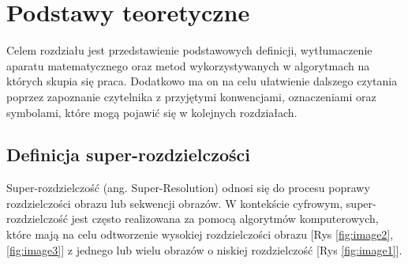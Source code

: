 \chapter{Podstawy teoretyczne}

Celem rozdziału jest przedstawienie podstawowych definicji, wytłumaczenie aparatu matematycznego oraz metod wykorzystywanych w algorytmach na których skupia się praca. Dodatkowo ma on na celu ułatwienie dalszego czytania poprzez zapoznanie czytelnika z przyjętymi konwencjami, oznaczeniami oraz symbolami, które mogą pojawić się w kolejnych rozdziałach. 


\section{Definicja super-rozdzielczości}

Super-rozdzielczość (ang. Super-Resolution) odnosi się do procesu poprawy rozdzielczości obrazu lub sekwencji obrazów. W kontekście cyfrowym, super-rozdzielczość jest często realizowana za pomocą algorytmów komputerowych, które mają na celu odtworzenie wysokiej rozdzielczości obrazu [Rys \ref{fig:image2}, \ref{fig:image3}] z jednego lub wielu obrazów o niskiej rozdzielczość [Rys \ref{fig:image1}].

